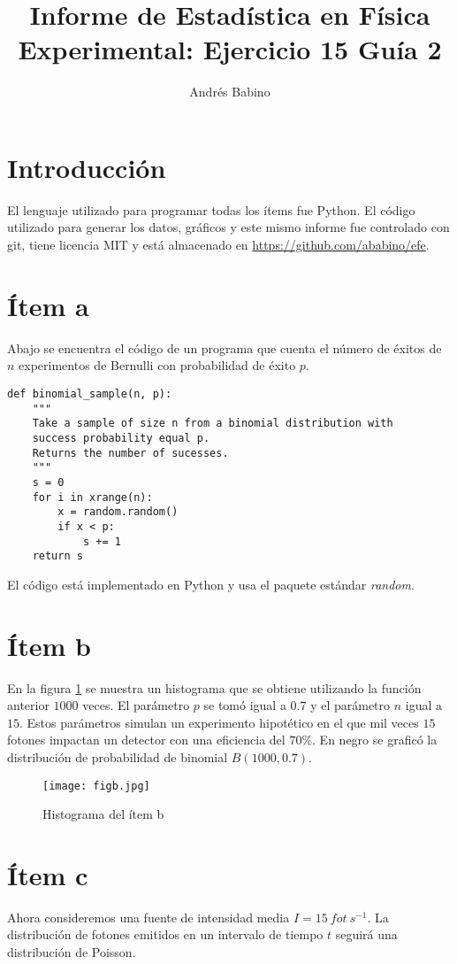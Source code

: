 \documentclass{article}
\title{Informe de Estadística en Física Experimental: Ejercicio 15 Guía 2}
\author{Andr\'es Babino}
\begin{document}
\maketitle
\section{Introducción}
El lenguaje utilizado para programar todas los ítems fue Python.
El código utilizado para generar los datos, gráficos y este mismo informe fue controlado con git, tiene licencia MIT y está almacenado en \url{https://github.com/ababino/efe}.

\section{Ítem a}
Abajo se encuentra el código de un programa que cuenta el número de éxitos de $n$ experimentos de Bernulli  con probabilidad de éxito $p$.
\begin{lstlisting}
def binomial_sample(n, p):
    """
    Take a sample of size n from a binomial distribution with
    success probability equal p.
    Returns the number of sucesses.
    """
    s = 0
    for i in xrange(n):
        x = random.random()
        if x < p:
            s += 1
    return s
\end{lstlisting}
El código está implementado en Python y usa el paquete estándar \textit{random}.

\section{Ítem b}
En la figura \ref{fig:itemb} se muestra un histograma que se obtiene utilizando la función anterior $1000$ veces.
El parámetro $p$ se tomó igual a $0.7$ y el parámetro $n$ igual a $15$.
Estos parámetros simulan un experimento hipotético en el que mil veces $15$ fotones impactan un detector con una eficiencia del $70\%$.
En negro se graficó la distribución de probabilidad de binomial $B(1000, 0.7)$.

\begin{figure}
\centering
\texttt{[image: figb.jpg]}
\caption[]{Histograma del ítem b}
\label{fig:itemb}
\end{figure}

\section{Ítem c}
Ahora consideremos una fuente de intensidad media $I=15\ fot\ s^{-1}$.
La distribución de fotones emitidos en un intervalo de tiempo $t$ seguirá una distribución de Poisson.
\end{document}
